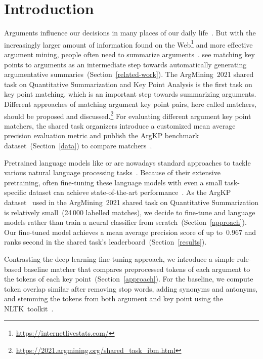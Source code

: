 \section{Introduction}\label{introduction}

Arguments influence our decisions in many places of our daily life~\cite{Bar-HaimEFKLS2020}.
But with the increasingly larger amount of information found on the Web\footnote{\url{https://internetlivestats.com/}} and more effective argument mining, people often need to summarize arguments~\cite{LawrenceR2019,Bar-HaimEFKLS2020}.
\citet{Bar-HaimEFKLS2020} see matching key points to arguments as an intermediate step towards automatically generating argumentative summaries~(Section~\ref{related-work}).
The ArgMining~2021 shared task on Quantitative Summarization and Key Point Analysis is the first task on key point matching, which is an important step towards summarizing arguments.
Different approaches of matching argument key point pairs, here called matchers, should be proposed and discussed.\footnote{\url{https://2021.argmining.org/shared_task_ibm.html}}
For evaluating different argument key point matchers, the shared task organizers introduce a customized mean average precision evaluation metric and publish the ArgKP benchmark dataset~(Section~\ref{data}) to compare matchers~\cite{Bar-HaimEFKLS2020}. %

Pretrained language models like \Bert or \Roberta are nowadays standard approaches to tackle various natural language processing tasks~\cite{DevlinCLT2019,LiuOGDJCLLZS2019}.
Because of their extensive pretraining, often fine-tuning these language models with even a small task-specific dataset can achieve state-of-the-art performance~\cite{DevlinCLT2019}.
As the ArgKP dataset~\cite{Bar-HaimEFKLS2020} used in the ArgMining~2021 shared task on Quantitative Summarization is relatively small~(24\,000 labelled matches), we decide to fine-tune \Bert and \Roberta language models rather than train a neural classifier from scratch~(Section~\ref{approach}).
Our fine-tuned \RobertaBase model achieves a mean average precision score of up to~0.967 and ranks second in the shared task's leaderboard~(Section~\ref{results}).

Contrasting the deep learning fine-tuning approach, we introduce a simple rule-based baseline matcher that compares preprocessed tokens of each argument to the tokens of each key point~(Section~\ref{approach}). For the baseline, we compute token overlap similar after removing stop words, adding synonyms and antonyms, and stemming the tokens from both argument and key point using the NLTK~toolkit~\cite{BirdL2004}.